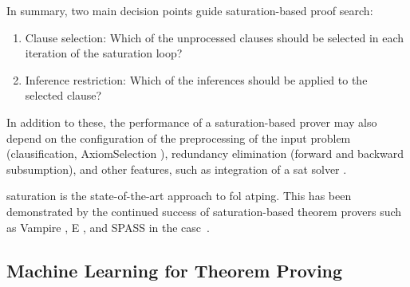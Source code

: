 

In summary, two main decision points guide \gls{saturation}-based proof search:
\begin{enumerate}
\item Clause selection: Which of the unprocessed clauses should be selected in each iteration of the saturation loop?
\item Inference restriction: Which of the inferences should be applied to the selected clause?
\end{enumerate}

In addition to these, the performance of a saturation-based prover may also depend on the configuration of the preprocessing of the input problem (clausification, \gls{AxiomSelection} \cite{DBLP:conf/cade/HoderV11,DBLP:conf/cade/KuhlweinLTUH12}), redundancy elimination (forward and backward subsumption), and other features, such as integration of a \gls{sat} solver \cite{DBLP:conf/cav/Voronkov14}.


\Gls{saturation} is the state-of-the-art approach to \gls{fol} \gls{atping}.
This has been demonstrated by the continued success of saturation-based theorem provers such as Vampire \cite{DBLP:conf/cav/KovacsV13}, E \cite{DBLP:conf/cade/0001CV19}, and SPASS \cite{DBLP:conf/cade/WeidenbachDFKSW09} in the \gls{casc}~\cite{Sut16}.

\subsection{Machine Learning for Theorem Proving}

